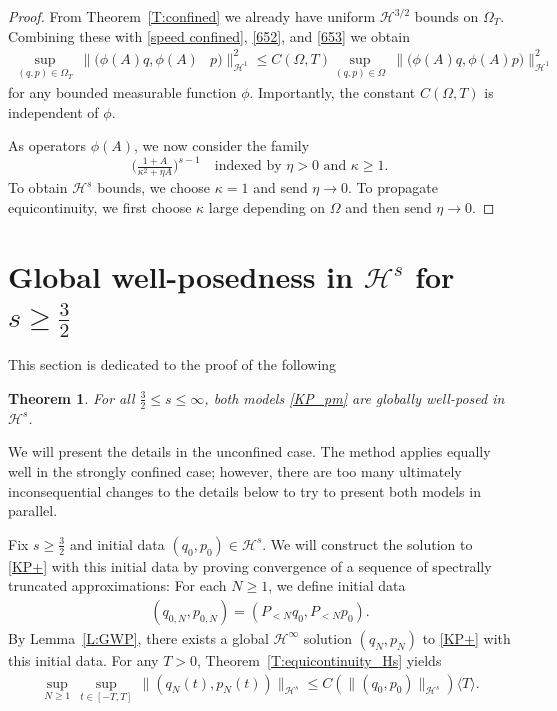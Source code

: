 \documentclass{amsart}
\newtheorem{theorem}{Theorem}[section]
\theoremstyle{definition}
\numberwithin{equation}{section}
\renewcommand{\H}{\mathcal H}
\newcommand{\la}{\langle}
\newcommand{\ra}{\rangle}
\begin{document}
\begin{proof}
From Theorem~\ref{T:confined} we already have uniform $\H^{3/2}$ bounds on $\Omega_T$. Combining these with \eqref{speed confined}, \eqref{652}, and \eqref{653} we obtain
\begin{equation}\label{C:1.2b}
\begin{aligned}
\sup_{(q,p)\in\Omega_T} \ \bigl\| \bigl( \phi(A) q, \phi(A) & p \bigr)\bigr\|_{\H^1}^2 \leq C(\Omega,T) 
	\sup_{(q,p)\in\Omega} \ \bigl\| \bigl( \phi(A) q, \phi(A) p \bigr)\bigr\|_{\H^1}^2
\end{aligned}
\end{equation}
for any bounded measurable function $\phi$.  Importantly, the constant $C(\Omega,T)$ is independent of $\phi$.

As operators $\phi(A)$, we now consider the family
$$
\bigl(\tfrac{1 + A}{\kappa^2+\eta A}\bigr)^{s-1} \quad\text{indexed by $\eta>0$ and $\kappa\geq 1$.}
$$
To obtain $\H^s$ bounds, we choose $\kappa=1$ and send $\eta\to0$.  To propagate equicontinuity, we first choose $\kappa$ large depending on $\Omega$ and then send $\eta\to0$.
\end{proof}


\section{Global well-posedness in $\H^s$ for $s\geq \frac32$}\label{S:5}

This section is dedicated to the proof of the following
\begin{theorem}\label{T:GWP Hs}
For all $\frac 32\leq s\leq \infty$, both models \eqref{KP_pm} are globally well-posed in $\H^s$.
\end{theorem}

We will present the details in the unconfined case.  The method applies equally well in the strongly confined case; however, there are too many ultimately inconsequential changes to the details below to try to present both models in parallel.

Fix $s\geq \frac 32$ and initial data $(q_0,p_0)\in\H^s$. We will construct the solution to \eqref{KP+} with this initial data by proving convergence of a sequence of spectrally truncated approximations: For each $N\geq 1$, we define initial data
\begin{align*}
(q_{0,N}, p_{0,N}) = (P_{<N} q_0, P_{<N} p_0).
\end{align*}
By Lemma~\ref{L:GWP}, there exists a global $\H^\infty$ solution $(q_N, p_N)$ to \eqref{KP+} with this initial data. For any $T>0$,  Theorem~\ref{T:equicontinuity_Hs} yields
\begin{align}\label{221}
\sup_{N\geq 1}\,\sup_{t\in [-T,T]} \,\|(q_N(t),p_N(t))\|_{\H^s} \leq C(\|(q_0,p_0)\|_{\H^s})\la T\ra.
\end{align}
\end{document}
